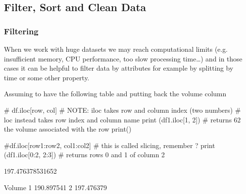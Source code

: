\subsection{Filter, Sort and Clean Data}\label{filter-sort-and-clean-data}

\subsubsection{Filtering}\label{filtering}

When we work with huge datasets we may reach computational limits (e.g. insufficient memory, CPU performance, too slow processing time\ldots) and in those cases it can be helpful to filter data by attributes for example by splitting by time or some other property.

Assuming to have the following table and putting back the volume column

\begin{ipython}
# df.iloc[row, col]
# NOTE: iloc takes row and column index (two numbers)
# loc instead takes row index and column name
print (df1.iloc[1, 2]) # returns 62 the volume associated with the row
print()

#df.iloc[row1:row2, col1:col2]
# this is called slicing, remember ?
print (df1.iloc[0:2, 2:3]) # returns rows 0 and 1 of column 2
\end{ipython}
\begin{ioutput}
197.476378531652

       Volume
1  190.897541
2  197.476379
\end{ioutput}

